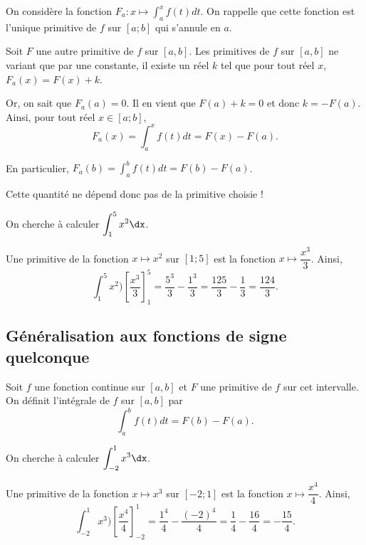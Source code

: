 \documentclass[11pt,fleqn, openany]{book} %
\begin{document}
\begin{demonstration} On considère la fonction $F_a:x\mapsto \displaystyle\int_{a}^x f(t)dt$. On rappelle que cette fonction est l'unique primitive de $f$ sur $[a;b]$ qui s'annule en $a$. 

Soit $F$ une autre primitive de $f$ sur $[a,b]$. Les primitives de $f$ sur $[a,b]$ ne variant que par une constante, il existe un réel $k$ tel que pour tout réel $x$, $F_a(x)=F(x)+k$. 

Or, on sait que $F_a(a)=0$. Il en vient que $F(a)+k=0$ et donc $k=-F(a)$. Ainsi, pour tout réel $x \in [a;b]$, 
\[F_a(x)=\displaystyle\int_{a}^x f(t)dt=F(x)-F(a).\]

En particulier, $F_a(b)=\displaystyle\int_{a}^b f(t)dt=F(b)-F(a)$.\end{demonstration}
 
Cette quantité ne dépend donc pas de la primitive choisie !
 
\begin{example}On cherche à calculer  $\displaystyle\int_{1}^5 x^2 \dx $.

Une primitive de la fonction $x\mapsto x^2$ sur $[1;5]$ est la fonction $x\mapsto \dfrac{x^3}{3}$. Ainsi,
\[\int_{1}^5 x^2 ) \left[ \dfrac{x^3}{3}\right]_1^5=\dfrac{5^3}{3}-\dfrac{1^3}{3}=\dfrac{125}{3}-\dfrac{1}{3}=\dfrac{124}{3}.\]
\end{example}
 

\subsection{Généralisation aux fonctions de signe quelconque}

\begin{definition}Soit $f$ une fonction continue sur $[a,b]$ et $F$ une primitive de $f$ sur cet intervalle. On définit l'intégrale de $f$ sur $[a,b]$ par \[\displaystyle\int_{a}^b f(t)dt = F(b)-F(a).\]\end{definition}

\begin{example} On cherche à calculer $\displaystyle\int_{-2}^1 x^3 \dx$.

Une primitive de la fonction $x\mapsto x^3$ sur $[-2;1]$ est la fonction $x\mapsto \dfrac{x^4}{4}$. Ainsi,
\[\int_{-2}^1 x^3 ) \left[ \dfrac{x^4}{4}\right]_{-2}^1=\dfrac{1^4}{4}-\dfrac{(-2)^4}{4}=\dfrac{1}{4}-\dfrac{16}{4}=-\dfrac{15}{4}.\]
\end{example}

 \newpage
\end{document}
